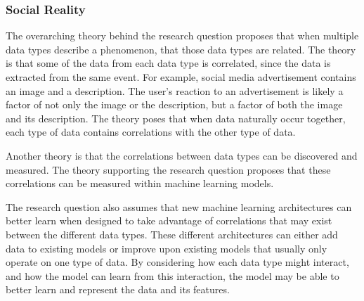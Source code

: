 \subsubsection{Social Reality}

The overarching theory behind the research question proposes that when multiple data types describe a phenomenon, that those data types are related. The theory is that some of the data from each data type is correlated, since the data is extracted from the same event.  %
For example, social media advertisement contains an image and a description.  The user's reaction to an advertisement is likely a factor of not only the image or the description, but a factor of both the image and its description.  The theory poses that when data naturally occur together, each type of data contains correlations with the other type of data.

Another theory is that the correlations between data types can be discovered and measured. The theory supporting the research question proposes that these correlations can be measured within machine learning models.

The research question also assumes that new machine learning architectures can better learn when designed to take advantage of correlations that may exist between the different data types.  These different architectures can either add data to existing models or improve upon existing models that usually only operate on one type of data.  By considering how each data type might interact, and how the model can learn from this interaction, the model may be able to better learn and represent the data and its features.  
